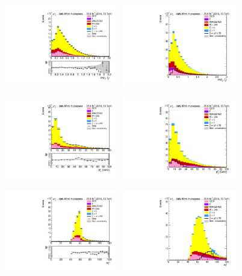 \begin{figure}[htp]
	\includegraphics[width=0.45\textwidth]{plots/mt/DiEta_CR.pdf}
	\includegraphics[width=0.45\textwidth]{plots/mt/DiEta_withsignal.pdf}

	\includegraphics[width=0.45\textwidth]{plots/mt/DiLepPt_CR.pdf}
	\includegraphics[width=0.45\textwidth]{plots/mt/DiLepPt_withsignal.pdf}

	\includegraphics[width=0.45\textwidth]{plots/mt/DiTransverseMass_CR.pdf}
	\includegraphics[width=0.45\textwidth]{plots/mt/DiTransverseMass_withsignal.pdf}
\end{figure}


